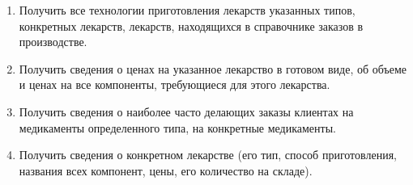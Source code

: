 \documentclass[a4paper]{article}
\begin{document}
\begin{enumerate}
			\item Получить все технологии приготовления лекарств указанных типов, конкретных лекарств, лекарств, находящихся в справочнике заказов в производстве.
			
			
			
			
			
			\item Получить сведения о ценах на указанное лекарство в готовом виде, об объеме и ценах на все компоненты, требующиеся для этого лекарства.
			
			
			
			\item Получить сведения о наиболее часто делающих заказы клиентах на медикаменты определенного типа, на конкретные медикаменты.
			
			\item Получить сведения о конкретном лекарстве (его тип, способ приготовления, названия всех компонент, цены, его количество на складе).
			
			
			
			
		\end{enumerate}
\end{document}
